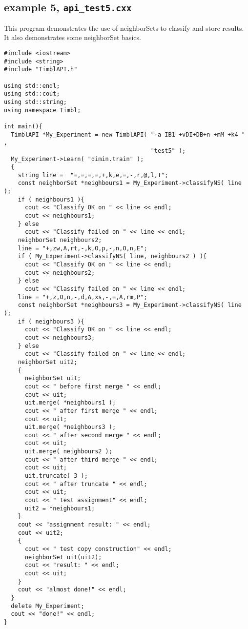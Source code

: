 \documentclass{report}
\begin{document}
\subsection{example 5, {\tt api\_test5.cxx}}

This program demonstrates the use of neighborSets to classify and
store results. It also demonstrates some neighborSet basics.

\begin{footnotesize}
\begin{verbatim}
#include <iostream>
#include <string>
#include "TimblAPI.h"

using std::endl;
using std::cout;
using std::string;
using namespace Timbl;

int main(){
  TimblAPI *My_Experiment = new TimblAPI( "-a IB1 +vDI+DB+n +mM +k4 " , 
                                          "test5" );
  My_Experiment->Learn( "dimin.train" );  
  {
    string line =  "=,=,=,=,+,k,e,=,-,r,@,l,T";
    const neighborSet *neighbours1 = My_Experiment->classifyNS( line );
    if ( neighbours1 ){
      cout << "Classify OK on " << line << endl;
      cout << neighbours1;
    } else
      cout << "Classify failed on " << line << endl;
    neighborSet neighbours2;
    line = "+,zw,A,rt,-,k,O,p,-,n,O,n,E";
    if ( My_Experiment->classifyNS( line, neighbours2 ) ){
      cout << "Classify OK on " << line << endl;
      cout << neighbours2;
    } else
      cout << "Classify failed on " << line << endl;
    line = "+,z,O,n,-,d,A,xs,-,=,A,rm,P";
    const neighborSet *neighbours3 = My_Experiment->classifyNS( line );
    if ( neighbours3 ){
      cout << "Classify OK on " << line << endl;
      cout << neighbours3;
    } else
      cout << "Classify failed on " << line << endl;
    neighborSet uit2;
    {
      neighborSet uit;
      cout << " before first merge " << endl;
      cout << uit;
      uit.merge( *neighbours1 );
      cout << " after first merge " << endl;
      cout << uit;
      uit.merge( *neighbours3 );
      cout << " after second merge " << endl;
      cout << uit;
      uit.merge( neighbours2 );
      cout << " after third merge " << endl;
      cout << uit;
      uit.truncate( 3 );
      cout << " after truncate " << endl;
      cout << uit;
      cout << " test assignment" << endl;
      uit2 = *neighbours1;
    }
    cout << "assignment result: " << endl;
    cout << uit2;
    {
      cout << " test copy construction" << endl;
      neighborSet uit(uit2);
      cout << "result: " << endl;
      cout << uit;
    }
    cout << "almost done!" << endl;
  }
  delete My_Experiment;
  cout << "done!" << endl;
}
\end{verbatim}
\end{footnotesize}
\end{document}
